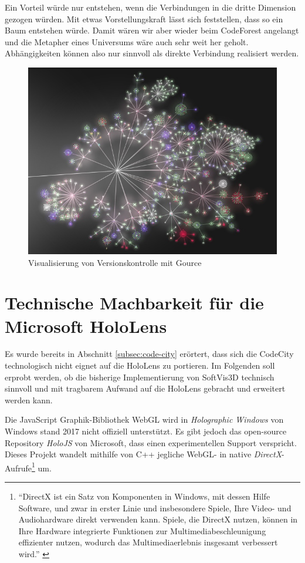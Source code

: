 Ein Vorteil würde nur entstehen, wenn die Verbindungen in die dritte Dimension gezogen würden. Mit etwas Vorstellungskraft lässt sich feststellen, dass so ein Baum entstehen würde. Damit wären wir aber wieder beim CodeForest angelangt und die Metapher eines Universums wäre auch sehr weit her geholt. Abhängigkeiten können also nur sinnvoll als direkte Verbindung realisiert werden.

\begin{figure}[htbp]
	\centering
	\includegraphics[width=0.5\linewidth]{figures/gource}
	\caption[Visualisierung von Versionskontrolle mit Gource]{Visualisierung von Versionskontrolle mit Gource\protect\footnotemark} \label{fig:gource}
\end{figure}

\section{Technische Machbarkeit für die Microsoft HoloLens}
\label{sec:technologie}

Es wurde bereits in Abschnitt \ref{subsec:code-city} erörtert, dass sich die CodeCity technologisch nicht eignet auf die HoloLens zu portieren. Im Folgenden soll erprobt werden, ob die bisherige Implementierung von SoftVis3D technisch sinnvoll und mit tragbarem Aufwand auf die HoloLens gebracht und erweitert werden kann.

Die JavaScript Graphik-Bibliothek WebGL wird in \textit{Holographic Windows} von Windows stand 2017 nicht offiziell unterstützt. Es gibt jedoch das open-source Repository \textit{HoloJS} von Microsoft, dass einen experimentellen Support verspricht. Dieses Projekt wandelt mithilfe von C++ jegliche WebGL- in native \textit{DirectX}-Aufrufe\footnote{"`DirectX ist ein Satz von Komponenten in Windows, mit dessen Hilfe Software, und zwar in erster Linie und insbesondere Spiele, Ihre Video- und Audiohardware direkt verwenden kann.  Spiele, die DirectX nutzen, können in Ihre Hardware integrierte Funktionen zur Multimediabeschleunigung effizienter nutzen, wodurch das Multimediaerlebnis insgesamt verbessert wird."' \cite{microsoft2017directx}} um.

